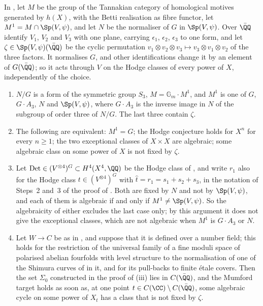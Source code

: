 \begin{proposition}\label{prop:mumfordmotivic}
In , let $M$ be the group of the Tannakian category of
homological motives generated by $h(X)$, with the Betti realisation as fibre
functor, let $M^{1}=M\cap\Sp(V,\psi)$, and let $N$ be the normaliser of $G$ in
$\Sp(V,\psi)$. Over $\bar{\QQ}$ identify $V_{1}$, $V_{2}$ and $V_{3}$ with one
plane, carrying $\epsilon_{1}$, $\epsilon_{2}$, $\epsilon_{3}$ to one form, and
let $\zeta\in\Sp(V,\psi)(\bar{\QQ})$ be the cyclic permutation
$v_{1}\otimes v_{2}\otimes v_{3}\mapsto v_{3}\otimes v_{1}\otimes v_{2}$ of
the three factors. It normalises $G$, and other identifications change it by
an element of $G(\bar{\QQ})$; so it acts through $V$ on the Hodge classes of
every power of $X$, independently of the choice.
\begin{enumerate}[label=\textup{(\roman*)},leftmargin=2.6em,itemsep=2pt]
\item $N/G$ is a form of the symmetric group $S_{3}$,
  $M=\mathbb{G}_{m}\cdot M^{1}$, and $M^{1}$ is one of $G$, $G\cdot A_{3}$,
  $N$ and $\Sp(V,\psi)$, where $G\cdot A_{3}$ is the inverse image in $N$ of
  the subgroup of order three of $N/G$. The last three contain $\zeta$.
\item The following are equivalent: $M^{1}=G$; the Hodge conjecture holds for
  $X^{n}$ for every $n\ge1$; the two exceptional classes of $X\times X$ are
  algebraic; some algebraic class on some power of $X$ is not fixed by
  $\zeta$.
\item Let $\mathrm{Det}\in(V^{\otimes4})^{G}\subset H^{4}(X^{4},\QQ)$ be the
  Hodge class of , and write $r_{1}$ also for the Hodge
  class $t\in(V^{\otimes4})^{G}$ with $\hat{t}=r_{1}=s_{1}+s_{2}+s_{3}$, in the
  notation of Steps~2 and~3 of the proof of . Both
  are fixed by $N$ and not by $\Sp(V,\psi)$, and each of them is algebraic if
  and only if $M^{1}\ne\Sp(V,\psi)$. So the algebraicity of either excludes
  the last case only; by this argument it does not give the exceptional
  classes, which are not algebraic when $M^{1}$ is $G\cdot A_{3}$ or $N$.
\item Let $W\to C$ be as in , and suppose that it
  is defined over a number field; this holds for the restriction of the
  universal family of a fine moduli space of polarised abelian fourfolds with
  level structure to the normalisation of one of the Shimura curves of
  \cite{Mum69} in it, and for its pull-backs to finite \'etale covers. Then the
  set $\Sigma_{0}$ constructed in the proof of (iii) lies
  in $C(\bar{\QQ})$, and the Mumford target holds as soon as, at one point
  $t\in C(\CC)\setminus C(\bar{\QQ})$, some algebraic cycle on some power of
  $X_{t}$ has a class that is not fixed by $\zeta$.
\end{enumerate}
\end{proposition}

